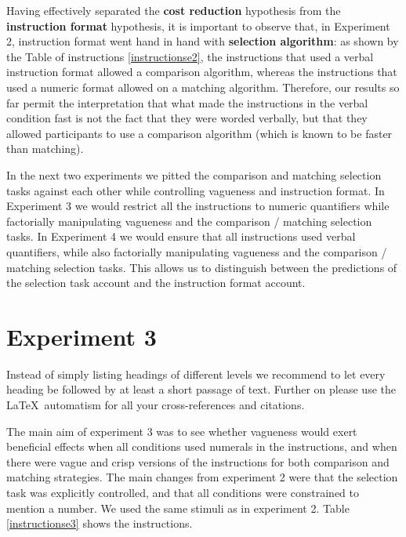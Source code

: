 Having effectively separated the {\bf cost reduction} hypothesis from the {\bf instruction format} hypothesis, it is important to observe that, in Experiment 2, instruction format went hand in hand with {\bf selection algorithm}: as shown by the Table of instructions \ref{instructionse2}, the instructions that used a verbal instruction format allowed a comparison algorithm, whereas the instructions that used a numeric format allowed on a matching algorithm. Therefore, our results so far permit the interpretation that what made the instructions in the verbal condition fast is not the fact that they were worded verbally, but that they allowed participants to use a comparison algorithm (which is known to be faster than matching). %

In the next two experiments we pitted the comparison and matching selection tasks against each other while controlling vagueness and instruction format. In Experiment 3 we would restrict all the instructions to numeric quantifiers while factorially manipulating vagueness and the comparison / matching selection tasks. In Experiment 4 we would ensure that all instructions used verbal quantifiers, while also factorially manipulating vagueness and the comparison / matching selection tasks. This allows us to distinguish between the predictions of the selection task account and the instruction format account. 




\section{Experiment 3}
\label{sec:4}
Instead of simply listing headings of different levels we recommend to let every heading be followed by at least a short passage of text. Further on please use the \LaTeX\ automatism for all your cross-references and citations.

The main aim of experiment 3 was to see whether vagueness would exert beneficial effects when all conditions used numerals in the instructions, and when there were vague and crisp versions of the instructions for both comparison and matching strategies. The main changes from experiment 2 were that the selection task was explicitly controlled, and that all conditions were constrained to mention a number. We used the same stimuli as in experiment 2. Table \ref{instructionse3} shows the instructions. %

